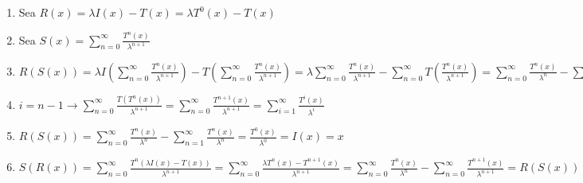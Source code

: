 \begin{enumerate}
	\item Sea $R(x) = \lambda I(x) - T(x) = \lambda T^0(x) - T(x)$ 
  \item Sea $S(x) = \sum_{n=0}^\infty \frac{T^n(x)}{\lambda^{n+1}}$
	\item $R(S(x)) = \lambda I(\sum_{n=0}^\infty \frac{T^n(x)}{\lambda^{n+1}}) - T(\sum_{n=0}^\infty \frac{T^n(x)}{\lambda^{n+1}}) = \lambda \sum_{n=0}^\infty \frac{T^n(x)}{\lambda^{n+1}} - \sum_{n=0}^\infty T(\frac{T^n(x)}{\lambda^{n+1}}) = \sum_{n=0}^\infty \frac{T^n(x)}{\lambda^{n}} - \sum_{n=0}^\infty \frac{T(T^n(x))}{\lambda^{n+1}}$
	\item $i = n-1 \to \sum_{n=0}^\infty \frac{T(T^n(x))}{\lambda^{n+1}} = \sum_{n=0}^\infty \frac{T^{n+1}(x)}{\lambda^{n+1}} = \sum_{i=1}^\infty \frac{T^i(x)}{\lambda^{i}}$
	\item $R(S(x)) = \sum_{n=0}^\infty \frac{T^n(x)}{\lambda^{n}} - \sum_{n=1}^\infty \frac{T^n(x)}{\lambda^{n}} = \frac{T^0(x)}{\lambda^0} = I(x) = x$
	\item $S(R(x)) = \sum_{n=0}^\infty \frac{T^n(\lambda I(x) - T(x))}{\lambda^{n+1}}  = \sum_{n=0}^\infty \frac{\lambda T^n( x) - T^{n+1}(x)}{\lambda^{n+1}} = \sum_{n=0}^\infty \frac{T^n( x)}{\lambda^{n}} - \sum_{n=0}^\infty \frac{T^{n+1}( x)}{\lambda^{n+1}} = R(S(x)) = x$
\end{enumerate}
